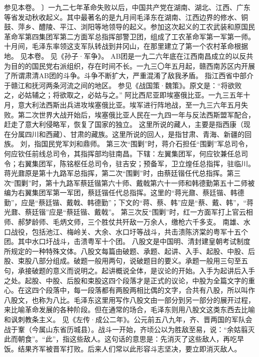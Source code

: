 \begin{maonote}
参见本卷。
〕一九二七年革命失败以后，中国共产党在湖南、湖北、江西、广东等省发动秋收起义。其中最著名的是九月间毛泽东在湖南、江西边界的修水、铜鼓、萍乡、醴陵、平江、浏阳等地领导的起义。参加这次起义的工农武装和原国民革命军第四集团军第二方面军总指挥部警卫团，组成了工农革命军第一军第一师。十月间，毛泽东率领这支军队转战到井冈山，在那里建立了第一个农村革命根据地。
见本卷。
见《孙子·军争》。
AB团是一九二六年底在江西南昌成立的以反共为目的的国民党右派组织，存在时间不长。一九三〇年五月起，赣西南苏区内开展了所谓肃清AB团的斗争。斗争不断扩大，严重混淆了敌我矛盾。
指江西省中部介于赣江和抚河两条河流之间的地区。
参见《战国策·魏策》。原文是：“将欲败之，必姑辅之；将欲取之，必姑与之。”
阿比西尼亚即埃塞俄比亚。一九三五年十月，意大利法西斯出兵进攻埃塞俄比亚。埃军进行阵地战，至一九三六年五月失败。第二次世界大战开始后，埃塞俄比亚人民在一九四一年与反法西斯盟军配合，赶走了意大利侵略军，恢复了国家的独立。
这里所说的藏人，主要是指西康（现在分属四川和西藏）、甘肃的藏族。这里所说的回人，是指甘肃、青海、新疆的回族。
刘，指国民党军刘和鼎师。
第三次“围剿”时，蒋介石担任“围剿”军总司令，何应钦任前线总司令，其指挥部均驻南昌。下辖：左翼集团军，何应钦兼任总司令；右翼集团军，陈铭枢任总司令，驻吉安；预备军，卫立煌任总指挥，驻临川。
蒋光鼐原是第十九路军总指挥，第二次“围剿”时，由蔡廷锴任代总指挥。第三次“围剿”时，第十九路军蔡廷锴第六十师、戴戟第六十一师和韩德勤第五十二师被编为右翼集团军第一军团，蔡廷锴任代总指挥。这里的“蒋光鼐、蔡廷锴、韩德勤”，应是“蔡廷锴、戴戟、韩德勤”；下文的“蒋、蔡、韩”应是“蔡、戴、韩”，“蒋光鼐、蔡廷锴”应是“蔡廷锴、戴戟”。
第三次反“围剿”时，红一方面军打上官云相师、郝梦龄师、毛炳文师，三个胜仗共歼敌一万余人，缴枪六千多支。
南雄、水口战役，包括池江、梅岭关、大余、水口圩等战斗，共击溃陈济棠的粤军十五个团。其中水口圩战斗，击溃粤军十个团。
八股文是中国明、清封建皇朝考试制度所规定的一种特殊文体。八股文每篇由破题、承题、起讲、入手、起股、中股、后股、束股八部分组成。破题一般用两句，说破题目的要义。承题一般用三句至五句，承接破题的意义而说明之。起讲概说全体，是议论的开始。入手为起讲后入手之处。起股、中股、后股和束股这四个段落才是正式的议论，中股为全篇文字的重心。在这四个段落中，每一段落都有两股两相比偶的文字，合共有八股，所以叫作八股文，也称为八比。毛泽东这里用写作八股文由一部分到另一部分的展开过程，来比喻革命发展的各种阶段。但在通常的场合，毛泽东则用八股文这类东西去比喻和讽刺教条主义。
见《左传·成公二年》。公元前五八九年，齐、晋两国的军队会战于鞌（今属山东省历城县）。战斗一开始，齐顷公以为胜敌至易，说：“余姑翦灭此而朝食”。“此”，指这些敌人。这句话的意思是：先消灭了这些敌人，再吃早饭。结果齐军被晋军打败。后来人们常以此形容斗志坚决，要立即消灭敌人。
\end{maonote}

